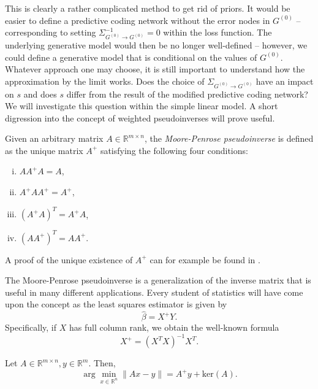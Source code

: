 \documentclass[a4paper,11pt]{report}
\begin{document}
\begin{Par}
This is clearly a rather complicated method to get rid of priors. It would be easier to define a predictive coding network without the error nodes in $G^{(0)}$ -- corresponding to setting $\Sigma_{G^{(0)}\to G^{(0)}}^{-1}=0$ within the loss function. The underlying generative model would then be no longer well-defined -- however, we could define a generative model that is conditional on the values of $G^{(0)}$.\\
Whatever approach one may choose, it is still important to understand how the approximation by the limit works. Does the choice of $\Sigma_{G^{(0)}\to G^{(0)}}$ have an impact on $s$ and does $s$ differ from the result of the modified predictive coding network? We will investigate this question within the simple linear model. A short digression into the concept of weighted pseudoinverses will prove useful.
\end{Par}

\begin{Def}
Given an arbitrary matrix $A\in\mathbb{R}^{m\times n}$, the \emph{Moore-Penrose pseudoinverse} is defined as the unique matrix $A^+$ satisfying the following four conditions:
\begin{enumerate}[(i)]
\item
$AA^+A=A$,
\item
$A^+AA^+=A^+$, 
\item
$(A^+A)^T=A^+A$, 
\item
$(AA^+)^T=AA^+$.
\end{enumerate}
A proof of the unique existence of $A^+$ can for example be found in \cite{Barata2012}.
\end{Def}

\begin{Par}
The Moore-Penrose pseudoinverse is a generalization of the inverse matrix that is useful in many different applications. Every student of statistics will have come upon the concept as the least squares estimator is given by 
\[
\hat{\beta}=X^+Y.
\]
Specifically, if $X$ has full column rank, we obtain the well-known formula
\[
X^+=(X^TX)^{-1}X^T.
\]
\end{Par}

\begin{The}\label{the:ls}
Let $A\in\mathbb{R}^{m\times n},y\in\mathbb{R}^m$. Then,
\begin{equation}
\arg\min_{x\in\mathbb{R}^n}\|Ax-y\|=A^+y+\text{ker}(A).
\end{equation}
\end{The}
\end{document}
